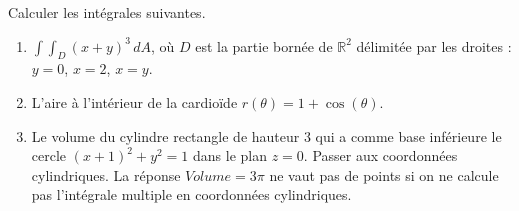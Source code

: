\begin{exercice}\label{exoGeomAnal-0048}

Calculer les intégrales suivantes.
  \begin{enumerate}
  \item $\displaystyle \int\int_D (x+y)^3\,dA$, où $D$ est la partie bornée de $\mathbb{R}^2$ délimitée par les droites : $y=0$, $x=2$, $x=y$.
  \item L'aire à l'intérieur de la cardioïde $r(\theta)=1+\cos(\theta)$.
  \item Le volume du cylindre rectangle de hauteur $3$ qui a comme base inférieure le cercle  $(x+1)^2+y^2=1$ dans le plan $z=0$. Passer aux coordonnées cylindriques. La réponse $Volume= 3\pi$ ne vaut pas de points si on ne calcule pas l'intégrale multiple en coordonnées cylindriques.   
  \end{enumerate}

\end{exercice}
